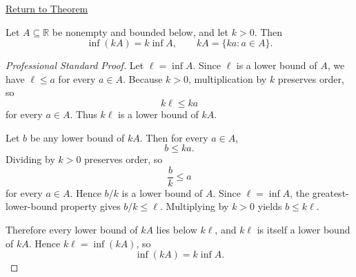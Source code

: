 \newpage
{}
\label{prf:positive-scalar-mult-infimum}

\begin{remark*}[Return]
\hyperref[thm:positive-scalar-mult-infimum]{Return to Theorem}
\end{remark*}

\begin{theorem*}
Let $A\subseteq\mathbb{R}$ be nonempty and bounded below, and let $k>0$.
Then
\[
  \inf(kA)=k\inf A,
  \qquad
  kA=\{ka:a\in A\}.
\]
\end{theorem*}

\begin{proof}[Professional Standard Proof]
\LRAProofBodyStart
Let \(\ell=\inf A\). Since \(\ell\) is a lower bound of \(A\), we have
\(\ell\le a\) for every \(a\in A\). Because \(k>0\), multiplication by \(k\)
preserves order, so
\[
  k\ell\le ka
\]
for every \(a\in A\). Thus \(k\ell\) is a lower bound of \(kA\).

Let \(b\) be any lower bound of \(kA\). Then for every \(a\in A\),
\[
  b\le ka.
\]
Dividing by \(k>0\) preserves order, so
\[
  \frac{b}{k}\le a
\]
for every \(a\in A\). Hence \(b/k\) is a lower bound of \(A\). Since
\(\ell=\inf A\), the greatest-lower-bound property gives \(b/k\le \ell\).
Multiplying by \(k>0\) yields \(b\le k\ell\).

Therefore every lower bound of \(kA\) lies below \(k\ell\), and \(k\ell\) is
itself a lower bound of \(kA\). Hence \(k\ell=\inf(kA)\), so
\[
  \inf(kA)=k\inf A.
\]
\end{proof}

